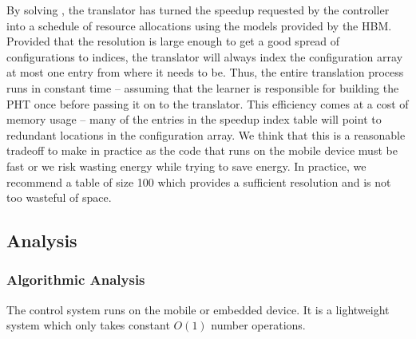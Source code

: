 By solving , the translator has turned the speedup
requested by the controller into a schedule of resource allocations
using the models provided by the HBM.  Provided that the resolution is
large enough to get a good spread of configurations to indices, the
translator will always index the configuration array at most one entry
from where it needs to be.  Thus, the entire translation process runs
in constant time -- assuming that the learner is responsible for
building the PHT once before passing it on to the translator.  This
efficiency comes at a cost of memory usage -- many of the entries in
the speedup index table will point to redundant locations in the
configuration array.  We think that this is a reasonable tradeoff to
make in practice as the code that runs on the mobile device must be
fast or we risk wasting energy while trying to save energy.  In
practice, we recommend a table of size 100 which provides a sufficient
resolution and is not too wasteful of space.

\subsection{Analysis}
\subsubsection{Algorithmic Analysis}

The control system runs on the mobile or embedded device. It is a lightweight system which only takes constant $O(1)$ number operations.

